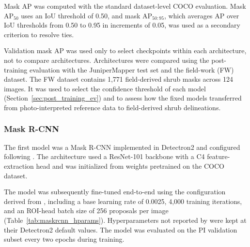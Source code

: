 \documentclass[12pt,a4paper]{article}
\begin{document}
Mask AP was computed with the standard dataset-level COCO evaluation. Mask AP$_{50}$ uses an IoU threshold of 0.50, and mask AP$_{50:95}$, which averages AP over IoU thresholds from 0.50 to 0.95 in increments of 0.05, was used as a secondary criterion to resolve ties.

Validation mask AP was used only to select checkpoints within each architecture, not to compare architectures. Architectures were compared using the post-training evaluation with the JuniperMapper test set and the field-work (FW) dataset. The FW dataset contains 1,771 field-derived shrub masks across 124 images. It was used to select the confidence threshold of each model (Section~\ref{sec:post_training_ev}) and to assess how the fixed models transferred from photo-interpreted reference data to field-derived shrub delineations.

\subsubsection{Mask R-CNN}

The first model was a Mask R-CNN implemented in Detectron2 and configured following \citet{khaldi2024individual}. The architecture used a ResNet-101 backbone with a C4 feature-extraction head and was initialized from weights pretrained on the COCO dataset.

The model was subsequently fine-tuned end-to-end using the configuration derived from \citet{khaldi2024individual}, including a base learning rate of 0.0025, 4,000 training iterations, and an ROI-head batch size of 256 proposals per image (Table~\ref{tab:maskrcnn_hparams}). Hyperparameters not reported by \citet{khaldi2024individual} were kept at their Detectron2 default values. The model was evaluated on the PI validation subset every two epochs during training.
\end{document}
